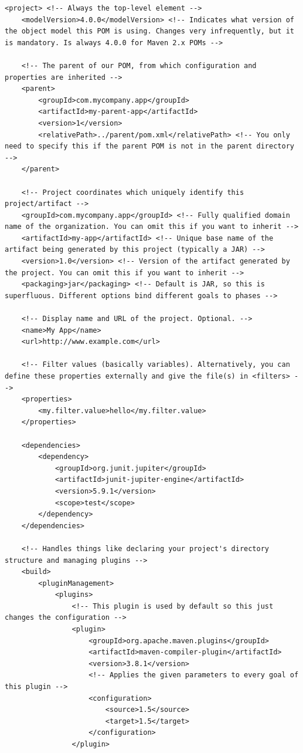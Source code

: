 \documentclass[table, xcdraw]{article}%
\begin{document}
\begin{verbatim}
<project> <!-- Always the top-level element -->
    <modelVersion>4.0.0</modelVersion> <!-- Indicates what version of the object model this POM is using. Changes very infrequently, but it is mandatory. Is always 4.0.0 for Maven 2.x POMs -->

    <!-- The parent of our POM, from which configuration and properties are inherited -->
    <parent>
        <groupId>com.mycompany.app</groupId>
        <artifactId>my-parent-app</artifactId>
        <version>1</version>
        <relativePath>../parent/pom.xml</relativePath> <!-- You only need to specify this if the parent POM is not in the parent directory -->
    </parent>
  
    <!-- Project coordinates which uniquely identify this project/artifact -->
    <groupId>com.mycompany.app</groupId> <!-- Fully qualified domain name of the organization. You can omit this if you want to inherit -->
    <artifactId>my-app</artifactId> <!-- Unique base name of the artifact being generated by this project (typically a JAR) -->
    <version>1.0</version> <!-- Version of the artifact generated by the project. You can omit this if you want to inherit -->
    <packaging>jar</packaging> <!-- Default is JAR, so this is superfluous. Different options bind different goals to phases -->

    <!-- Display name and URL of the project. Optional. -->
    <name>My App</name>
    <url>http://www.example.com</url>

    <!-- Filter values (basically variables). Alternatively, you can define these properties externally and give the file(s) in <filters> -->
    <properties>
        <my.filter.value>hello</my.filter.value>
    </properties>

    <dependencies>
        <dependency>
            <groupId>org.junit.jupiter</groupId>
            <artifactId>junit-jupiter-engine</artifactId>
            <version>5.9.1</version>
            <scope>test</scope>
        </dependency>
    </dependencies>

    <!-- Handles things like declaring your project's directory structure and managing plugins -->
    <build>
        <pluginManagement>
            <plugins>
                <!-- This plugin is used by default so this just changes the configuration -->
                <plugin>
                    <groupId>org.apache.maven.plugins</groupId>
                    <artifactId>maven-compiler-plugin</artifactId>
                    <version>3.8.1</version>
                    <!-- Applies the given parameters to every goal of this plugin -->
                    <configuration>
                        <source>1.5</source>
                        <target>1.5</target>
                    </configuration>
                </plugin>


\end{verbatim}
\end{document}
